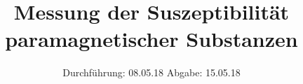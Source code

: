 

\subject{V606}
\title{Messung der Suszeptibilität paramagnetischer Substanzen}
\date{%
  Durchführung: 08.05.18
  \hspace{3em}
  Abgabe: 15.05.18
}



\maketitle
\thispagestyle{empty}
\tableofcontents
\newpage







\printbibliography{}



